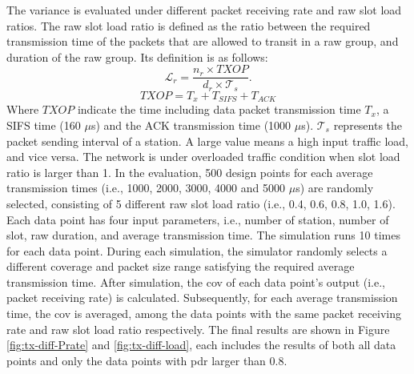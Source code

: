 The variance is evaluated under different packet receiving rate and \gls{raw} slot load ratios. The \gls{raw} slot load ratio is defined as the ratio between the required transmission time of the 
packets that are allowed to transit in a \gls{raw} group, and duration of the \gls{raw} group. Its definition is as follows:
 \\
\begin{equation}
\mathcal{L}_{r} = \frac {n_r \times TXOP} {d_r \times \mathcal{T}_s}. 
\end{equation}
\begin{equation}
TXOP = T_x + T_{SIFS} +  T_{ACK}
\end{equation}
Where $TXOP$ indicate the time including data packet transmission time $T_x$, a SIFS time (160 $\mu$s) and the ACK transmission time (1000 $\mu$s). $\mathcal{T}_s$ represents the packet sending interval of a station. A large value means a high input traffic load, and vice versa. The network is under overloaded traffic condition when slot load ratio is larger than 1.
In the evaluation, 500 design points for each average transmission times (i.e., 1000, 2000, 3000, 4000 and 5000 $\mu$s) are randomly selected, 
consisting of 5 different \gls{raw} slot load ratio (i.e., 0.4, 0.6, 0.8, 1.0, 1.6). Each data point has four input parameters, i.e., number of station, number of slot, \gls{raw} duration, and average transmission time. The simulation runs 10 times for each data point. During each simulation, the simulator randomly selects a different coverage and packet size range satisfying the required average transmission time. After simulation, the \gls{cov} of each data point's output (i.e., packet receiving rate) is calculated. Subsequently, for each average transmission time, the \gls{cov} is averaged, among the data points with the same packet receiving rate and \gls{raw} slot load ratio respectively. The final results are shown in Figure \ref{fig:tx-diff-Prate} and \ref{fig:tx-diff-load}, each includes the results of both all data points and only the data points with \gls{pdr} larger than 0.8.



